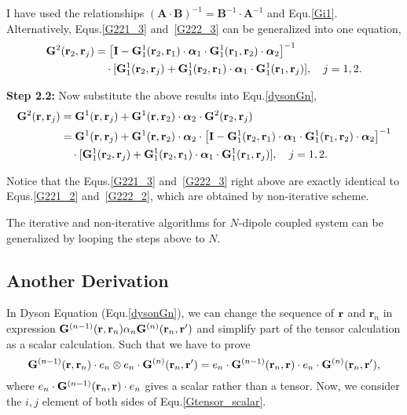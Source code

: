 I have used the relationships  $(\mathbf{A}\cdot\mathbf{B})^{-1}=\mathbf{B}^{-1}\cdot \mathbf{A}^{-1}$ and Equ.\eqref{Gi1}.
Alternatively, Equs.\eqref{G221_3} and~\eqref{G222_3} can be generalized into one equation,
\begin{align}
 \mathbf{G}^2(\mathbf{r}_2,\mathbf{r}_j)
&=\left[\mathbf{I}-\mathbf{G}^1_1(\mathbf{r}_2,\mathbf{r}_1)\cdot {\bm \alpha}_1\cdot \mathbf{G}^1_1(\mathbf{r}_1,\mathbf{r}_2) \cdot {\bm \alpha}_2\right]^{-1} \\
&\quad \cdot [\mathbf{G}^1_1(\mathbf{r}_2,\mathbf{r}_j)+\mathbf{G}^1_1(\mathbf{r}_2,\mathbf{r}_1)\cdot {\bm \alpha}_1\cdot \mathbf{G}^1_1(\mathbf{r}_1,\mathbf{r}_j)],\quad j=1,2.\label{G22r_3}
\end{align}


{\bf{Step 2.2:}} Now substitute the above results into Equ.\eqref{dysonGn},
\begin{equation}
\label{G2rr}
\begin{aligned}
\mathbf{G}^2(\mathbf{r},\mathbf{r}_j) &=\mathbf{G}^1(\mathbf{r},\mathbf{r}_j)+{\mathbf{G}^1(\mathbf{r},\mathbf{r}_2) \cdot {\bm \alpha}_2\cdot \mathbf{G}^2(\mathbf{r}_2,\mathbf{r}_j)} \\
&= \mathbf{G}^1(\mathbf{r},\mathbf{r}_j)+\mathbf{G}^1(\mathbf{r},\mathbf{r}_2) \cdot {\bm \alpha}_2\cdot \left[\mathbf{I}-\mathbf{G}^1_1(\mathbf{r}_2,\mathbf{r}_1)\cdot {\bm \alpha}_1\cdot \mathbf{G}^1_1(\mathbf{r}_1,\mathbf{r}_2) \cdot {\bm \alpha}_2\right]^{-1} \\
&\quad \cdot [\mathbf{G}^1_1(\mathbf{r}_2,\mathbf{r}_j)+\mathbf{G}^1_1(\mathbf{r}_2,\mathbf{r}_1)\cdot {\bm \alpha}_1\cdot \mathbf{G}^1_1(\mathbf{r}_1,\mathbf{r}_j)],\quad j=1,2.
\end{aligned}
\end{equation}

Notice that the Equs.\eqref{G221_3} and~\eqref{G222_3} right above are exactly identical to Equs.\eqref{G221_2} and~\eqref{G222_2}, which are obtained by non-iterative scheme.

The iterative and non-iterative algorithms for $N$-dipole coupled system can be generalized by looping the steps above to $N$.

\subsection{Another Derivation}\label{section:GFscalar}
In Dyson Equation (Equ.\eqref{dysonGn}), we can change the sequence of $\mathbf{r}$ and $\mathbf{r}_n$ in expression $\Gm1 (\br,\mathbf{r}_n)\mathbf{\alpha}_n\Gn(\mathbf{r}_n,\br')$ and simplify part of the tensor calculation as a scalar calculation. Such that we have to prove
\begin{equation}
 \label{Gtensor_scalar}
\Gm1(\br,\br_n)\cdot e_n \otimes e_n \cdot \Gn(\br_n,\br')=e_n\cdot \Gm1 (\br_n,\br)\cdot e_n\cdot \Gn(\br_n,\br'),
\end{equation}
where $e_n\cdot \Gm1 (\br_n,\br)\cdot e_n$ gives a scalar rather than a tensor.
Now, we consider the $i,j$ element of both sides of Equ.\eqref{Gtensor_scalar}.


